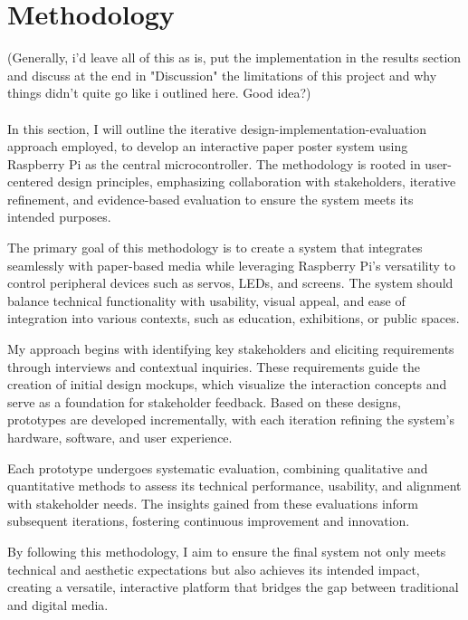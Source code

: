 \chapter{Methodology}
\label{sec:Methodology}

(Generally, i'd leave all of this as is, put the implementation in the results section and discuss at the end in "Discussion" the limitations of this project and why things didn't quite go like i outlined here. Good idea?)\\\\

In this section, I will outline the iterative design-implementation-evaluation approach employed, to develop an interactive paper poster system using Raspberry Pi as the central microcontroller. The methodology is rooted in user-centered design principles, emphasizing collaboration with stakeholders, iterative refinement, and evidence-based evaluation to ensure the system meets its intended purposes.

The primary goal of this methodology is to create a system that integrates seamlessly with paper-based media while leveraging Raspberry Pi's versatility to control peripheral devices such as servos, LEDs, and screens. The system should balance technical functionality with usability, visual appeal, and ease of integration into various contexts, such as education, exhibitions, or public spaces.

My approach begins with identifying key stakeholders and eliciting requirements through interviews and contextual inquiries. These requirements guide the creation of initial design mockups, which visualize the interaction concepts and serve as a foundation for stakeholder feedback. Based on these designs, prototypes are developed incrementally, with each iteration refining the system's hardware, software, and user experience.

Each prototype undergoes systematic evaluation, combining qualitative and quantitative methods to assess its technical performance, usability, and alignment with stakeholder needs. The insights gained from these evaluations inform subsequent iterations, fostering continuous improvement and innovation.

By following this methodology, I aim to ensure the final system not only meets technical and aesthetic expectations but also achieves its intended impact, creating a versatile, interactive platform that bridges the gap between traditional and digital media.

